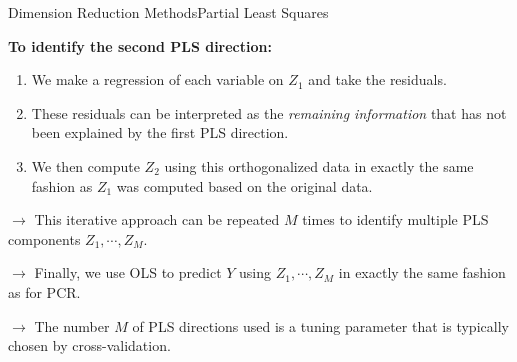 \begin{frame}{Dimension Reduction Methods}{Partial Least Squares}

\textbf{To identify the second PLS direction:}

    \begin{enumerate}
        \item We make a regression of each variable on $Z_1$ and take the residuals. \pause 
        
        \item These residuals can be interpreted as the \textit{remaining information} that has not been explained by the first PLS direction. \pause 
        
        \item We then compute $Z_2$ using this orthogonalized data in exactly the same fashion as $Z_1$ was computed based on the original data. \pause 
    \end{enumerate}


$\rightarrow$ This iterative approach can be repeated $M$ times to identify multiple PLS components $Z_1 , \cdots , Z_M $. \\ \pause 


$\rightarrow$ Finally, we use OLS to predict $Y$ using $Z_1 , \cdots , Z_M $ in exactly the same fashion as for PCR. \\ \pause 

$\rightarrow$ The number $M$ of PLS directions used is a tuning parameter that is typically chosen by cross-validation.

    
\end{frame}